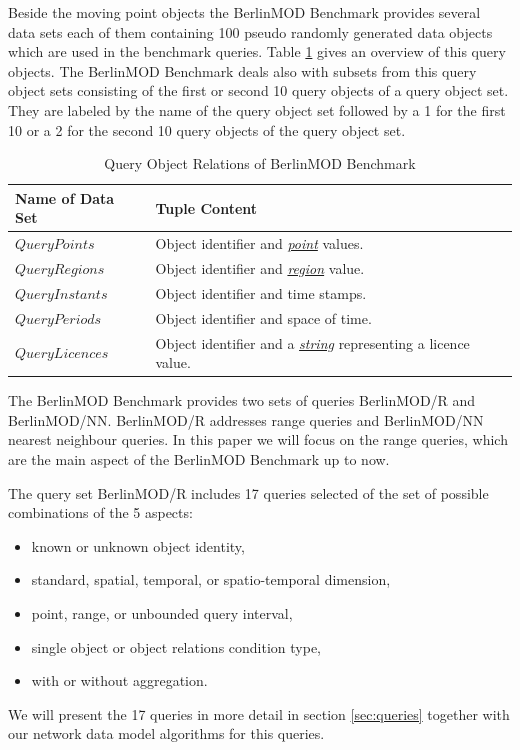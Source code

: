 \documentclass[a4paper]{article}
\newcommand{\bmodb} {BerlinMOD Benchmark}
\newcommand{\dt}[1]{\textsl{\underline{#1}}}
\begin{document}
Beside the moving point objects the \bmodb{} provides several data sets each of them
containing 100 pseudo randomly generated data objects which are used in the
benchmark queries. Table \ref{tab:queryobjects} gives an overview of this query
objects. The \bmodb{} deals also with subsets from this query object sets consisting
of the first or second 10 query objects of a query object set. They are labeled
by the name of the query object set followed by a 1 for the first 10 or a 2 for
the second 10 query objects of the query object set.

\begin{table}[H]
  \begin{tabularx}{1.0\textwidth}{|l|X|}
    \hline
    \textbf{Name of Data Set}&\textbf{Tuple Content}\\
    \hline
    $QueryPoints$&Object identifier and \dt{point} values.\\
    \hline
    $QueryRegions$&Object identifier and \dt{region} value.\\
    \hline
    $QueryInstants$&Object identifier and time stamps.\\
    \hline
    $QueryPeriods$&Object identifier and space of time.\\
    \hline
    $QueryLicences$& Object identifier and a \dt{string} representing a licence value.\\
    \hline
  \end{tabularx}
  \caption{Query Object Relations of \bmodb{}}
  \label{tab:queryobjects}
\end{table}

The \bmodb{} provides two sets of queries BerlinMOD/R and BerlinMOD/NN.
BerlinMOD/R addresses range queries and BerlinMOD/NN nearest neighbour queries.
In this paper we will focus on the range queries, which are the main aspect of the
\bmodb{} up to now.

The query set BerlinMOD/R includes 17 queries selected of the set of possible
combinations of the 5 aspects:
\begin{itemize}
  \item known or unknown object identity,
  \item standard, spatial, temporal, or spatio-temporal dimension,
  \item point, range, or unbounded query interval,
  \item single object or object relations condition type,
  \item with or without aggregation.
\end{itemize}
We will present the 17 queries in more detail in section \ref{sec:queries}
together with our network data model algorithms for this queries.
\end{document}
